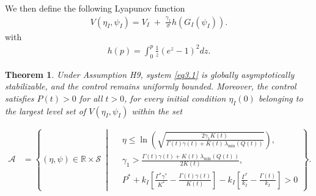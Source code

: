\documentclass[10pt, a4paper]{amsart}
\theoremstyle{plain}
\newtheorem{theorem}[lemma]{Theorem}
\theoremstyle{definition}
\theoremstyle{remark}
\numberwithin{equation}{section}
\begin{document}
We then define the following Lyapunov function
\begin{align}\label{e3.91}
    V(\eta_I,\psi_I)
= V_I\;+\;\frac{\gamma_1}{\sigma}h(G_I(\psi_I)).
\end{align}
with
\begin{align}\label{e3.92}
    h(p)=\displaystyle\int_0^p\frac{1}{z}(e^z-1)^2dz.
\end{align}

\begin{theorem}\label{th3.8}
Under Assumption H9, system \eqref{eq3.1} is globally asymptotically stabilizable, and the control remains uniformly bounded. Moreover,  the control satisfies \(P(t)>0\) for all \(t>0\), for every initial condition \(\eta_I(0)\) belonging to the largest level set of $V(\eta_I,\psi_I)$ within the set

 \begin{align}\label{e3.98}
\mathcal{A} &= 
\left\{ (\eta,\psi)\in\mathbb{R}\times\mathcal{S}\ \middle|\ 
\begin{aligned}
&\eta \le \ln\!\left(\sqrt{\frac{2\gamma_1 K(t)}{\Gamma(t)\gamma(t)+K(t)\,\lambda_{\min}(Q(t))}}\right),\\[4pt]
&\gamma_1 > \frac{\Gamma(t)\gamma(t)+K(t)\,\lambda_{\min}(Q(t))}{2K(t)},\\[4pt]
& P^*+k_I\!\left[\frac{\Gamma^*\gamma^*}{K^*}-\frac{\Gamma(t)\gamma(t)}{K(t)}\right]
 -k_I\!\left[\frac{\Gamma^*}{k_I}-\frac{\Gamma(t)}{k_I}\right]>0
\end{aligned}
\right\}.
\end{align}
\end{theorem}
\end{document}
